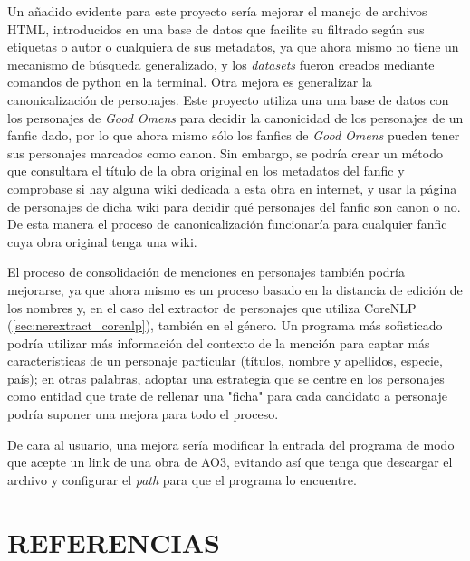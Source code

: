\documentclass{pre-tfg}
\begin{document}
Un añadido evidente para este proyecto sería mejorar el manejo de archivos HTML, introducidos en una base de datos que facilite su filtrado según sus etiquetas o autor o cualquiera de sus metadatos, ya que ahora mismo no tiene un mecanismo de búsqueda generalizado, y los \textit{datasets} fueron creados mediante comandos de python en la terminal. Otra mejora es generalizar la canonicalización de personajes. Este proyecto utiliza una una base de datos con los personajes de \textit{Good Omens} para decidir la canonicidad de los personajes de un fanfic dado, por lo que ahora mismo sólo los fanfics de \textit{Good Omens} pueden tener sus personajes marcados como canon. Sin embargo, se podría crear un método que consultara el título de la obra original en los metadatos del fanfic y comprobase si hay alguna wiki dedicada a esta obra en internet, y usar la página de personajes de dicha wiki para decidir qué personajes del fanfic son canon o no. De esta manera el proceso de canonicalización funcionaría para cualquier fanfic cuya obra original tenga una wiki.

El proceso de consolidación de menciones en personajes también podría mejorarse, ya que ahora mismo es un proceso basado en la distancia de edición de los nombres y, en el caso del extractor de personajes que utiliza CoreNLP (\ref{sec:nerextract_corenlp}), también en el género. Un programa más sofisticado podría utilizar más información del contexto de la mención para captar más características de un personaje particular (títulos, nombre y apellidos, especie, país); en otras palabras, adoptar una estrategia que se centre en los personajes como entidad\cite{wick_2009} que trate de rellenar una "ficha" para cada candidato a personaje podría suponer una mejora para todo el proceso.

De cara al usuario, una mejora sería modificar la entrada del programa de modo que acepte un link de una obra de AO3, evitando así que tenga que descargar el archivo y configurar el \textit{path} para que el programa lo encuentre.


\cleardoublepage
\section{REFERENCIAS}





\singlespacing
%

\end{document}
